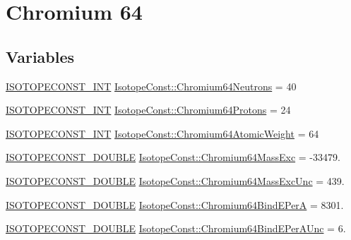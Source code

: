 \hypertarget{group___isotope_const-_chromium-_cr64}{}\section{Chromium 64}
\label{group___isotope_const-_chromium-_cr64}
\subsection*{Variables}
\begin{DoxyCompactItemize}
\item 
\mbox{\hyperlink{group___isotope_const-_macros_ga5f18360b3e99483a35c32d789e62621c}{I\+S\+O\+T\+O\+P\+E\+C\+O\+N\+S\+T\+\_\+\+I\+NT}} \mbox{\hyperlink{group___isotope_const-_chromium-_cr64_ga542cabddc1bf898cc0a3522ef904f6ff}{Isotope\+Const\+::\+Chromium64\+Neutrons}} = 40
\item 
\mbox{\hyperlink{group___isotope_const-_macros_ga5f18360b3e99483a35c32d789e62621c}{I\+S\+O\+T\+O\+P\+E\+C\+O\+N\+S\+T\+\_\+\+I\+NT}} \mbox{\hyperlink{group___isotope_const-_chromium-_cr64_ga9ae3f41312fd344dfcdd931dd83fb1aa}{Isotope\+Const\+::\+Chromium64\+Protons}} = 24
\item 
\mbox{\hyperlink{group___isotope_const-_macros_ga5f18360b3e99483a35c32d789e62621c}{I\+S\+O\+T\+O\+P\+E\+C\+O\+N\+S\+T\+\_\+\+I\+NT}} \mbox{\hyperlink{group___isotope_const-_chromium-_cr64_gaac7cf3a4a7bd6710bb53cade53d6a304}{Isotope\+Const\+::\+Chromium64\+Atomic\+Weight}} = 64
\item 
\mbox{\hyperlink{group___isotope_const-_macros_ga8f45a7272ce02c0b4c65c44636ed719a}{I\+S\+O\+T\+O\+P\+E\+C\+O\+N\+S\+T\+\_\+\+D\+O\+U\+B\+LE}} \mbox{\hyperlink{group___isotope_const-_chromium-_cr64_gafe8a8f8202820bf748d16053790a9ca7}{Isotope\+Const\+::\+Chromium64\+Mass\+Exc}} = -\/33479.
\item 
\mbox{\hyperlink{group___isotope_const-_macros_ga8f45a7272ce02c0b4c65c44636ed719a}{I\+S\+O\+T\+O\+P\+E\+C\+O\+N\+S\+T\+\_\+\+D\+O\+U\+B\+LE}} \mbox{\hyperlink{group___isotope_const-_chromium-_cr64_ga1cd9ef8ffc20773e980f1c568e1cb2d1}{Isotope\+Const\+::\+Chromium64\+Mass\+Exc\+Unc}} = 439.
\item 
\mbox{\hyperlink{group___isotope_const-_macros_ga8f45a7272ce02c0b4c65c44636ed719a}{I\+S\+O\+T\+O\+P\+E\+C\+O\+N\+S\+T\+\_\+\+D\+O\+U\+B\+LE}} \mbox{\hyperlink{group___isotope_const-_chromium-_cr64_gaa379198658c0ae826df2d745fd07545f}{Isotope\+Const\+::\+Chromium64\+Bind\+E\+PerA}} = 8301.
\item 
\mbox{\hyperlink{group___isotope_const-_macros_ga8f45a7272ce02c0b4c65c44636ed719a}{I\+S\+O\+T\+O\+P\+E\+C\+O\+N\+S\+T\+\_\+\+D\+O\+U\+B\+LE}} \mbox{\hyperlink{group___isotope_const-_chromium-_cr64_ga699564bba0e6ee6210ea8c58803cc9b7}{Isotope\+Const\+::\+Chromium64\+Bind\+E\+Per\+A\+Unc}} = 6.

\end{DoxyCompactItemize}

